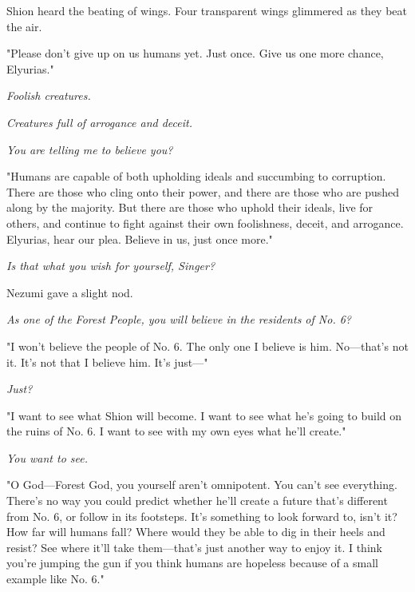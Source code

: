 Shion heard the beating of wings. Four transparent wings glimmered as
they beat the air.

"Please don't give up on us humans yet. Just once. Give us one more
chance, Elyurias."

\myspace

\emph{Foolish creatures.}

\emph{Creatures full of arrogance and deceit.}

\emph{You are telling me to believe you?}

\myspace

"Humans are capable of both upholding ideals and succumbing to
corruption. There are those who cling onto their power, and there are
those who are pushed along by the majority. But there are those who
uphold their ideals, live for others, and continue to fight against
their own foolishness, deceit, and arrogance. Elyurias, hear our plea.
Believe in us, just once more."

\myspace

\emph{Is that what you wish for yourself, Singer?}

\myspace

Nezumi gave a slight nod.

\myspace

\emph{As one of the Forest People, you will believe in the residents of No. 6?}

\myspace

"I won't believe the people of No. 6. The only one I believe is him.
No---that's not it. It's not that I believe him. It's just---"

\myspace

\emph{Just?}

\myspace

"I want to see what Shion will become. I want to see what he's going to
build on the ruins of No. 6. I want to see with my own eyes what he'll
create."

\myspace

\emph{You want to see.}

\myspace

"O God---Forest God, you yourself aren't omnipotent. You can't see
everything. There's no way you could predict whether he'll create a
future that's different from No. 6, or follow in its footsteps. It's
something to look forward to, isn't it? How far will humans fall? Where
would they be able to dig in their heels and resist? See where it'll
take them---that's just another way to enjoy it. I think you're jumping
the gun if you think humans are hopeless because of a small example like
No. 6."

